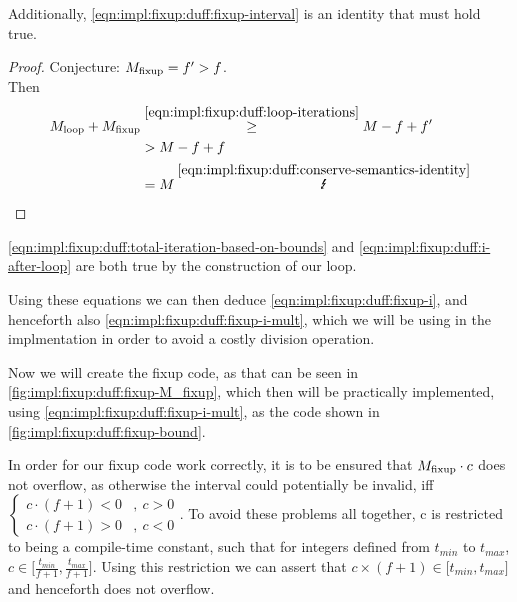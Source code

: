 Additionally, \cref{eqn:impl:fixup:duff:fixup-interval} is an identity that must hold true.
\begin{proof}\label{proof:impl:fixup:duff:fixup-interval}
    Conjecture: $M_{\text{fixup}} = f' > f$.\\
    Then
    \begin{align*}
        \Mloop + \Mfixup &\overset{\ref{eqn:impl:fixup:duff:loop-iterations}}{\geq} M - f + f' \\
        &> M - f + f \\
        &= M \medspace \overset{\ref{eqn:impl:fixup:duff:conserve-semantics-identity}}{\mLightning}
    \end{align*}
\end{proof}

\cref{eqn:impl:fixup:duff:total-iteration-based-on-bounds} and \cref{eqn:impl:fixup:duff:i-after-loop} are both true by the construction of our loop.

Using these equations we can then deduce \cref{eqn:impl:fixup:duff:fixup-i}, and henceforth also \cref{eqn:impl:fixup:duff:fixup-i-mult}, which we will be using in the implmentation in order to avoid a costly division operation.

Now we will create the fixup code, as that can be seen in \cref{fig:impl:fixup:duff:fixup-M_fixup}, which then will be practically implemented, using \cref{eqn:impl:fixup:duff:fixup-i-mult}, as the code shown in \cref{fig:impl:fixup:duff:fixup-bound}.





In order for our fixup code work correctly, it is to be ensured that $M_{\text{fixup}} \cdot c$ does not overflow, as otherwise the interval \cinterval could potentially be invalid, iff $
\begin{cases}
    c \cdot (f + 1) < 0 &, \medspace c > 0\\
    c \cdot (f + 1) > 0 &, \medspace c < 0
\end{cases}$.
To avoid these problems all together, c is restricted to being a compile-time constant, such that for integers defined from $t_{min}$ to $t_{max}$, $c \in \lbrack \frac{t_{min}}{f + 1}, \frac{t_{max}}{f + 1} \rbrack$.
Using this restriction we can assert that $c \times (f + 1) \in \lbrack t_{min}, t_{max} \rbrack$ and henceforth does not overflow.

